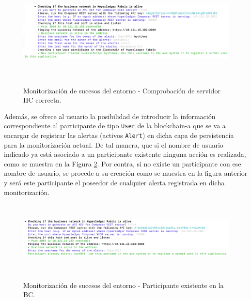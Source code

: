 \documentclass[12pt,a4paper, twoside]{report}
\begin{document}
\begin{itemize}
			\newpage
			
			\begin{figure}[!ht]   
				\caption{Monitorización de sucesos del entorno - Comprobación de servidor HC correcta.} 
				\begin{center} 
					\includegraphics[width=16cm,height=5cm]{Images/userGuide/monitoring/hcOk} \\
					\label{fig:userguide_monitoring_hcOk} 
				\end{center}  
			\end{figure}	 
	 	
	 	Además, se ofrece al usuario la posibilidad de introducir la información correspondiente al participante de tipo \texttt{User} de la \gls{blockchain-a} que se va a encargar de registrar las alertas (activos \texttt{Alert}) en dicha capa de persistencia para la monitorización actual. De tal manera, que si el nombre de usuario indicado ya está asociado a un participante existente ninguna acción es realizada, como se muestra en la Figura \ref{fig:userguide_monitoring_hcUser}. Por contra, si no existe un participante con ese nombre de usuario, se procede a su creación como se muestra en la figura anterior y será este participante el poseedor de cualquier alerta registrada en dicha monitorización.
	 	
			\begin{figure}[!ht]   
				\caption{Monitorización de sucesos del entorno - Participante existente en la BC.} 
				\begin{center} 
					\includegraphics[width=16cm,height=3.7cm]{Images/userGuide/monitoring/hcUser} \\
					\label{fig:userguide_monitoring_hcUser} 
				\end{center}  
			\end{figure}	 
	 	 

\end{itemize}
\end{document}
